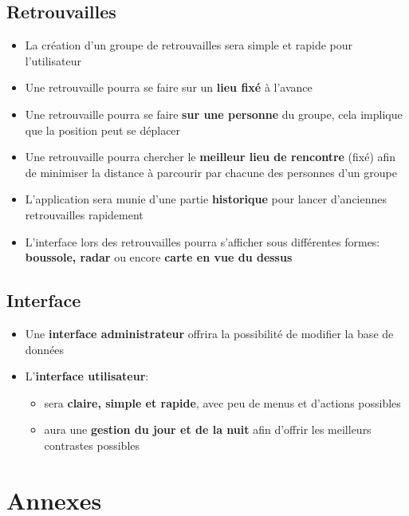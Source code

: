 \documentclass[french]{article}
\begin{document}
		\subsection{Retrouvailles}
			\begin{itemize}
				\item La création d'un groupe de retrouvailles sera simple et rapide pour l'utilisateur
				\item Une retrouvaille pourra se faire sur un \textbf{lieu fixé} à l'avance 
				\item Une retrouvaille pourra se faire \textbf{sur une personne} du groupe, cela implique que la position peut se déplacer
				\item Une retrouvaille pourra chercher le \textbf{meilleur lieu de rencontre} (fixé) afin de minimiser la distance à parcourir par chacune des personnes d'un groupe
				\item L'application sera munie d'une partie \textbf{historique} pour lancer d'anciennes retrouvailles rapidement 
				\item L'interface lors des retrouvailles pourra s'afficher sous différentes formes: \textbf{boussole, radar} ou encore \textbf{carte en vue du dessus}
			\end{itemize}
			
		\subsection{Interface}
			\begin{itemize}
				\item Une \textbf{interface administrateur} offrira la possibilité de modifier la base de données
				\item L'\textbf{interface utilisateur}:
				\begin{itemize}
					\item sera \textbf{claire, simple et rapide}, avec peu de menus et d'actions possibles
					\item aura une \textbf{gestion du jour et de la nuit} afin d'offrir les meilleurs contrastes possibles
				\end{itemize}
			\end{itemize}
		
	\section{Annexes}
\end{document}
